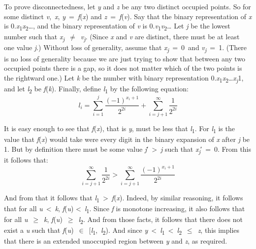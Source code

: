 \documentclass[
  11pt,
  letterpaper,
  DIV=11,
  numbers=noendperiod,
  twoside]{scrartcl}
\begin{document}
To prove disconnectedness, let \emph{y} and \emph{z} be any two distinct
occupied points. So for some distinct \emph{v},~\emph{x},
\emph{y}~=~\emph{f}(\emph{x}) and \emph{z}~=~\emph{f}(\emph{v}). Say
that the binary representation of \emph{x} is
0.\emph{x}\textsubscript{1}\emph{x}\textsubscript{2}\ldots, and the
binary representation of \emph{v} is
0.\emph{v}\textsubscript{1}\emph{v}\textsubscript{2}\ldots{} Let
\emph{j} be the lowest number such that
\emph{x\textsubscript{j}}~\({\neq}\)~\emph{v\textsubscript{j}}. (Since
\emph{x} and \emph{v} are distinct, there must be at least one value
\emph{j}.) Without loss of generality, assume that
\emph{x\textsubscript{j}}~=~0~and \emph{v\textsubscript{j}}~=~1. (There
is no loss of generality because we are just trying to show that between
any two occupied points there is a gap, so it does not matter which of
the two points is the rightward one.) Let \emph{k} be the number with
binary representation
0.\emph{x}\textsubscript{1}\emph{x}\textsubscript{2}\ldots{}\emph{x\textsubscript{j}}1,
and let \emph{l}\textsubscript{2} be \emph{f}(\emph{k}). Finally, define
\emph{l}\textsubscript{1} by the following equation:
\[l_i = \sum_{i=1}^j \frac{(-1)^{x_i+1}}{2^{2i}} + \sum_{i = j+1}^\infty \frac{1}{2^{2i}}\]

It is easy enough to see that \emph{f}(\emph{x}), that is \emph{y}, must
be less that \emph{l}\textsubscript{1}. For \emph{l}\textsubscript{1} is
the value that \emph{f}(\emph{x}) would take were every digit in the
binary expansion of \emph{x} after \emph{j} be 1. But by definition
there must be some value \emph{j}′~\textgreater~\emph{j} such that
\emph{x\textsubscript{j}}′~=~0. From this it follows that:
\[\sum_{i = j+1}^\infty \frac{1}{2^{2i}} > \sum_{i = j+1}^\infty \frac{(-1)^{x_i+1}}{2^{2i}}\]

And from that it follows that
\emph{l}\textsubscript{1}~\textgreater~\emph{f}(\emph{x}). Indeed, by
similar reasoning, it follows that for all \emph{u}~\textless~\emph{k},
\emph{f}(\emph{u}) \textless~\emph{l}\textsubscript{1}. Since \emph{f}
is monotone increasing, it also follows that for all
\emph{u}~\({\geq}\)~\emph{k},
\emph{f}(\emph{u})~\({\geq}\)~\emph{l}\textsubscript{2}. And from those
facts, it follows that there does not exist a \emph{u} such that
\emph{f}(\emph{u})~\({\in}\)~{[}\emph{l}\textsubscript{1},~\emph{l}\textsubscript{2}).
And since
\emph{y}~\textless~\emph{l}\textsubscript{1}~\textless~\emph{l}\textsubscript{2}~\({\leq}\)~\emph{z},
this implies that there is an extended unoccupied region between
\emph{y} and \emph{z}, as required.
\end{document}
